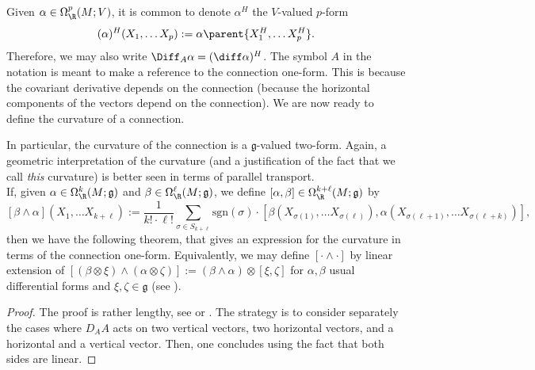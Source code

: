 Given \(\alpha \in \Omega^p_\R(M;V)\), it is common to denote \(\alpha^H\) the \(V\)-valued \(p\)-form
\[
(\alpha)^H(X_1, \ldots X_p):=\alpha\parent{X_1^H, \ldots X_p^H}.
\]
Therefore, we may also write \(\Diff_A \alpha = (\diff \alpha)^H\). The symbol \(A\) in the notation is meant to make a reference to the connection one-form. This is because the covariant derivative depends on the connection (because the horizontal components of the vectors depend on the connection). We are now ready to define the curvature of a connection.

In particular, the curvature of the connection is a \(\mathfrak{g}\)-valued two-form. Again, a geometric interpretation of the curvature (and a justification of the fact that we call \textit{this} curvature) is better seen in terms of parallel transport. \\

If, given \(\alpha \in \Omega^k_\R(M; \mathfrak{g})\) and \(\beta \in \Omega_\R^\ell(M;\mathfrak{g})\), we define \([\alpha, \beta]\in \Omega^{k+\ell}_\R(M; \mathfrak{g})\) by
\begin{equation} \label{bracket_g_valued_forms}
    [\beta\wedge  \alpha](X_1, \ldots X_{k+\ell}):=\frac{1}{k! \cdot \ell !} \sum_{\sigma \in S_{k +\ell}} \mathrm{sgn}(\sigma)\cdot [\beta(X_{\sigma(1)}, \ldots X_{\sigma(\ell)}), \alpha(X_{\sigma(\ell+1)}, \ldots X_{\sigma(\ell+k)})],
\end{equation}
then we have the following theorem, that gives an expression for the curvature in terms of the connection one-form. Equivalently, we may define \([\cdot \wedge \cdot ]\) by linear extension of \([(\beta \otimes \xi) \wedge (\alpha \otimes \zeta)]:=(\beta \wedge \alpha)\otimes [\xi, \zeta]\) for \(\alpha, \beta\) usual differential forms and \(\xi, \zeta \in \mathfrak{g}\) (see \parencite[Sec. 5.2]{hamilton2018mathematical}). 
\begin{proof}
    The proof is rather lengthy, see \parencite[Th. 5.2]{kobayashi_vol1} or \parencite[Th. 11.2]{sontz2015principal}. The strategy is to consider separately the cases where \(D_AA\) acts on two vertical vectors, two horizontal vectors, and a horizontal and a vertical vector. Then, one concludes using the fact that both sides are linear.
\end{proof}

